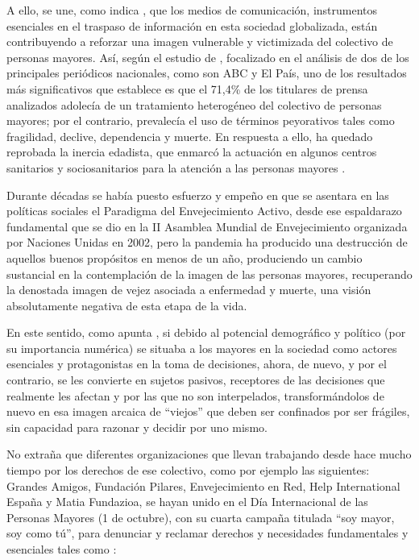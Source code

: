\documentclass{textolivre}
\begin{document}
A ello, se une, como indica \textcite{pinazo2020}, %
que los medios de comunicación, instrumentos esenciales en el traspaso de información en esta sociedad globalizada, están contribuyendo a reforzar una imagen vulnerable y victimizada del colectivo de personas mayores. Así, según el estudio de \textcite{bravovillar2020}, %
focalizado en el análisis de dos de los principales periódicos nacionales, como son ABC y El País, uno de los resultados más significativos que establece es que el 71,4\% de los titulares de prensa analizados adolecía de un tratamiento heterogéneo del colectivo de personas mayores; por el contrario, prevalecía el uso de términos peyorativos tales como fragilidad, declive, dependencia y muerte. En respuesta a ello, ha quedado reprobada la inercia edadista, que enmarcó la actuación en algunos centros sanitarios y sociosanitarios para la atención a las personas mayores \cite{tarazona2020}. %

Durante décadas se había puesto esfuerzo y empeño en que se asentara en las políticas sociales el Paradigma del Envejecimiento Activo, desde ese espaldarazo fundamental que se dio en la II Asamblea Mundial de Envejecimiento organizada por Naciones Unidas en 2002, pero la pandemia ha producido una destrucción de aquellos buenos propósitos en menos de un año, produciendo un cambio sustancial en la contemplación de la imagen de las personas mayores, recuperando la denostada imagen de vejez asociada a enfermedad y muerte, una visión absolutamente negativa de esta etapa de la vida.

En este sentido, como apunta \textcite{klein2020}, %
si debido al potencial demográfico y político (por su importancia numérica) se situaba a los mayores en la sociedad como actores esenciales y protagonistas en la toma de decisiones, ahora, de nuevo, y por el contrario, se les convierte en sujetos pasivos, receptores de las decisiones que realmente les afectan y por las que no son interpelados, transformándolos de nuevo en esa imagen arcaica de “viejos” que deben ser confinados por ser frágiles, sin capacidad para razonar y decidir por uno mismo.

No extraña que diferentes organizaciones que llevan trabajando desde hace mucho tiempo por los derechos de ese colectivo, como por ejemplo las siguientes: Grandes Amigos, Fundación Pilares, Envejecimiento en Red, Help International España y Matia Fundazioa, se hayan unido en el Día Internacional de las Personas Mayores (1 de octubre), con  su cuarta campaña titulada “soy mayor, soy como tú”, para denunciar y reclamar derechos y necesidades fundamentales y esenciales tales como \cite{helpage2020a}: %
\end{document}
